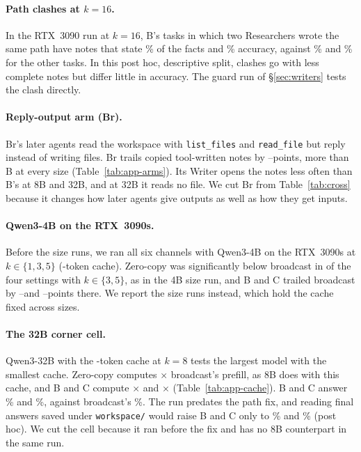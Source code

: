 \documentclass[sigplan,10pt,nonacm,review,anonymous]{acmart}
\begin{document}
\paragraph{Path clashes at $k=16$.} In the RTX~3090 run at $k=16$, B's \nAppClashN tasks in which two
Researchers wrote the same path have notes that state \nAppClashNotes\% of the facts and \nAppClashAcc\%
accuracy, against \nAppNoClashNotes\% and \nAppNoClashAcc\% for the other \nAppNoClashN tasks. In this post hoc,
descriptive split, clashes go with less complete notes but differ little in accuracy. The guard run of
\S\ref{sec:writers} tests the clash directly.

\paragraph{Reply-output arm (Br).} Br's later agents read the workspace with \texttt{list\_files} and
\texttt{read\_file} but reply instead of writing files. Br trails copied tool-written notes by
\nRFourteenBrGapMin--\nRFourteenBrGapMax points, more than B at every size (Table~\ref{tab:app-arms}). Its
Writer opens the notes less often than B's at 8B and 32B, and at 32B it reads no file. We cut Br from
Table~\ref{tab:cross} because it changes how later agents give outputs as well as how they get inputs.

\paragraph{Qwen3-4B on the RTX~3090s.} Before the size runs, we ran all six channels with Qwen3-4B on the
RTX~3090s at $k \in \{1, 3, 5\}$ (\nSmallKv-token cache). Zero-copy was significantly below broadcast in
\nSmallAZcSigThreeFiveWord of the four settings with $k \in \{3,5\}$, as in the 4B size run, and B and C
trailed broadcast by \nSmallBGapMinThreeFive--\nSmallBGapMaxThreeFive and
\nSmallCGapMinThreeFive--\nSmallCGapMaxThreeFive points there. We report the size runs instead, which hold the
cache fixed across sizes.

\paragraph{The 32B corner cell.} Qwen3-32B with the \nKvProSmall-token cache at $k=8$ tests the largest model
with the smallest cache. Zero-copy computes \nPCornerCompAZc$\times$ broadcast's prefill, as 8B does with this
cache, and B and C compute \nPCornerCompB$\times$ and \nPCornerCompC$\times$ (Table~\ref{tab:app-cache}). B and C
answer \nPRescueCornerBMeasured\% and \nPRescueCornerCMeasured\%, against broadcast's \nPCornerAccAOne\%. The run
predates the path fix, and reading final answers saved under \texttt{workspace/} would raise B and C only to
\nPRescueCornerB\% and \nPRescueCornerC\% (post hoc). We cut the cell because it ran before the fix and has no
8B counterpart in the same run.
\end{document}

